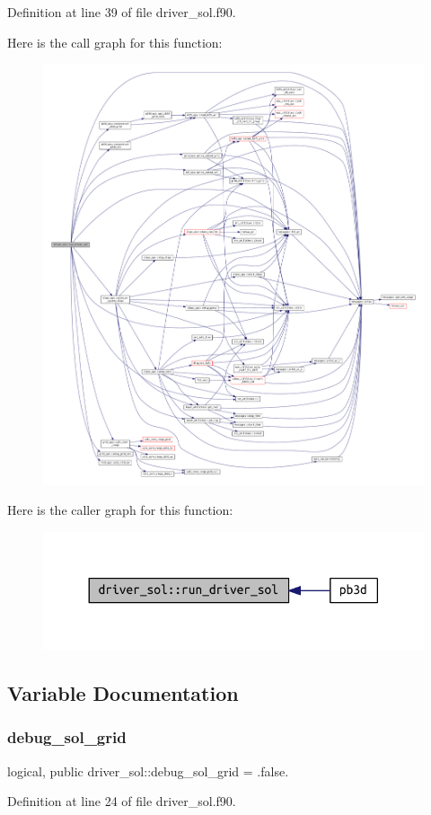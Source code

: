 Definition at line 39 of file driver\+\_\+sol.\+f90.

Here is the call graph for this function\+:
\nopagebreak
\begin{figure}[H]
\begin{center}
\leavevmode
\includegraphics[width=350pt]{namespacedriver__sol_a208ddea649ee160b7a55da8d0a5d4847_cgraph}
\end{center}
\end{figure}
Here is the caller graph for this function\+:
\nopagebreak
\begin{figure}[H]
\begin{center}
\leavevmode
\includegraphics[width=330pt]{namespacedriver__sol_a208ddea649ee160b7a55da8d0a5d4847_icgraph}
\end{center}
\end{figure}


\subsection{Variable Documentation}
\mbox{\label{namespacedriver__sol_a00a6ea22e1eda4ae9ec46da624d0cfb0}} 
\subsubsection{\texorpdfstring{debug\+\_\+sol\+\_\+grid}{debug\_sol\_grid}}
{\footnotesize\ttfamily logical, public driver\+\_\+sol\+::debug\+\_\+sol\+\_\+grid = .false.}



Definition at line 24 of file driver\+\_\+sol.\+f90.

